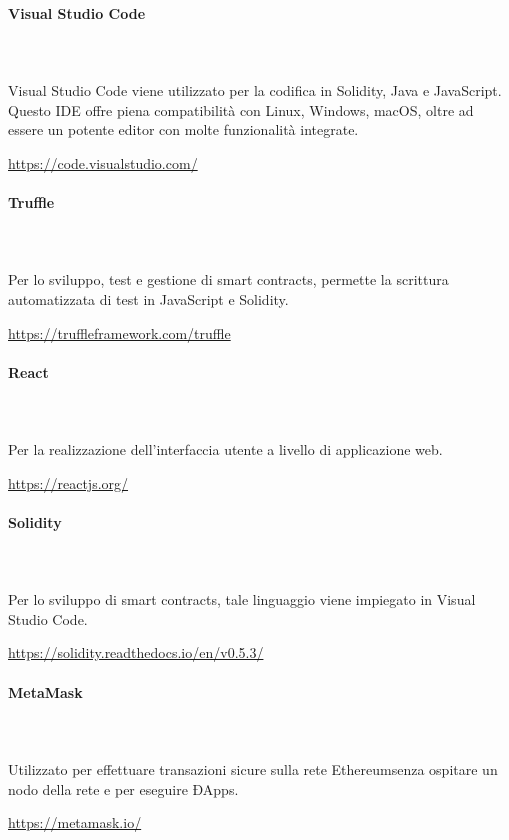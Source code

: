 \paragraph{Visual Studio Code} \mbox{}\\ \mbox{}\\
Visual Studio Code viene utilizzato per la codifica in Solidity, Java e JavaScript. Questo 
IDE offre piena compatibilità con Linux, Windows, macOS, oltre ad essere un 
potente editor con molte funzionalità integrate. \newline
\centerline{\url{https://code.visualstudio.com/}}

	
\paragraph{Truffle} \mbox{}\\ \mbox{}\\
Per lo sviluppo, test e gestione di smart contracts\glo, permette la scrittura automatizzata di test in JavaScript e Solidity\glo.\newline
\centerline{\url{https://truffleframework.com/truffle}}

\paragraph{React} \mbox{}\\ \mbox{}\\ 
Per la realizzazione dell'interfaccia utente a livello di applicazione web.\newline
\centerline{\url{https://reactjs.org/}}

\paragraph{Solidity} \mbox{}\\ \mbox{}\\ 
Per lo sviluppo di smart contracts\glo, tale linguaggio viene impiegato in Visual Studio Code.\newline
\centerline{\url{https://solidity.readthedocs.io/en/v0.5.3/}}

\paragraph{MetaMask} \mbox{}\\ \mbox{}\\ 
Utilizzato per effettuare transazioni sicure sulla rete Ethereum\glosp senza ospitare un nodo della rete e per eseguire ÐApps\glo. \newline
\centerline{\url{https://metamask.io/}}

